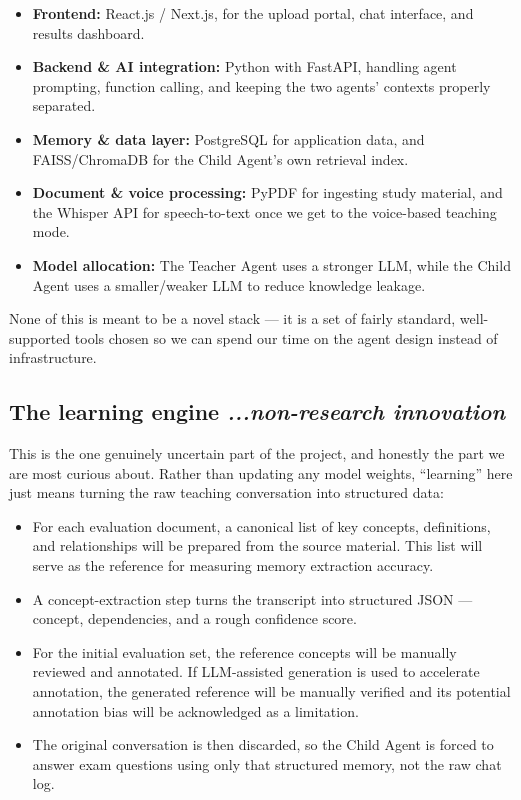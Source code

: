 \documentclass[11pt,a4paper]{article}
\newcommand{\mysubsection}[2]{%
    \subsection[#1]{#1 \hfill {\normalfont\itshape #2}}
}
\begin{document}
\begin{itemize}

    \item \textbf{Frontend:} React.js / Next.js, for the upload portal, chat interface, and results dashboard.

    \item \textbf{Backend \& AI integration:} Python with FastAPI, handling agent prompting, function calling, and keeping the two agents' contexts properly separated.

    \item \textbf{Memory \& data layer:} PostgreSQL for application data, and FAISS/ChromaDB for the Child Agent's own retrieval index.

    \item \textbf{Document \& voice processing:} PyPDF for ingesting study material, and the Whisper API for speech-to-text once we get to the voice-based teaching mode.

    \item\textbf{Model allocation:} The Teacher Agent uses a stronger LLM, while the Child Agent uses a smaller/weaker LLM to reduce knowledge leakage.

\end{itemize}

None of this is meant to be a novel stack --- it is a set of fairly standard, well-supported tools chosen so we can spend our time on the agent design instead of infrastructure.

\mysubsection{The learning engine}{...non-research innovation}

This is the one genuinely uncertain part of the project, and honestly the part we are most curious about. Rather than updating any model weights, ``learning'' here just means turning the raw teaching conversation into structured data:

\begin{itemize}

    \item For each evaluation document, a canonical list of key concepts, definitions, and relationships will be prepared from the source material. This list will serve as the reference for measuring memory extraction accuracy.
    
    \item A concept-extraction step turns the transcript into structured JSON --- concept, dependencies, and a rough confidence score.

    \item For the initial evaluation set, the reference concepts will be manually reviewed and annotated. If LLM-assisted generation is used to accelerate annotation, the generated reference will be manually verified and its potential annotation bias will be acknowledged as a limitation.

    \item The original conversation is then discarded, so the Child Agent is forced to answer exam questions using only that structured memory, not the raw chat log.

\end{itemize}
\end{document}
